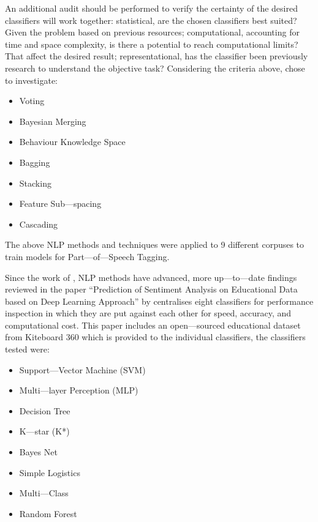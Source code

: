 An additional audit should be performed to verify the certainty of the desired classifiers will work together: statistical, are the chosen classifiers best suited? Given the problem based on previous resources; computational, accounting for time and space complexity, is there a potential to reach computational limits? That affect the desired result; representational, has the classifier been previously research to understand the objective task? Considering the criteria above, \textcite{enriquez2013comparative} chose to investigate:

\begin{itemize}
    \item Voting
    \item Bayesian Merging
    \item Behaviour Knowledge Space
    \item Bagging
    \item Stacking
    \item Feature Sub---spacing
    \item Cascading
\end{itemize}

The above NLP methods and techniques were applied to 9 different corpuses to train models for Part---of---Speech Tagging.

Since the work of \textcite{enriquez2013comparative}, NLP methods have advanced, more up---to---date findings reviewed in the paper “Prediction of Sentiment Analysis on Educational Data based on Deep Learning Approach” by \parencite{sultana2018prediction} centralises eight classifiers for performance inspection in which they are put against each other for speed, accuracy, and computational cost. This paper includes an open---sourced educational dataset from Kiteboard 360 which is provided to the individual classifiers, the classifiers tested were:

\begin{itemize}
    \item Support---Vector Machine (SVM)
    \item Multi---layer Perception (MLP)
    \item Decision Tree
    \item K---star (K*)
    \item Bayes Net
    \item Simple Logistics
    \item Multi---Class
    \item Random Forest
\end{itemize}

